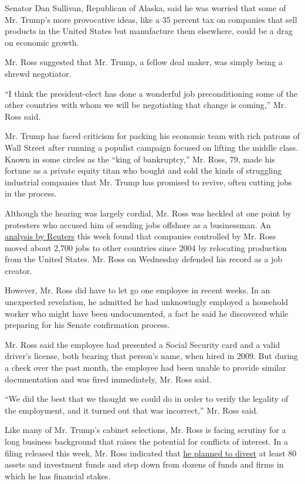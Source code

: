 Senator Dan Sullivan, Republican of Alaska, said he was worried that
some of Mr. Trump's more provocative ideas, like a 35 percent tax on
companies that sell products in the United States but manufacture them
elsewhere, could be a drag on economic growth.

Mr. Ross suggested that Mr. Trump, a fellow deal maker, was simply being
a shrewd negotiator.

``I think the president-elect has done a wonderful job preconditioning
some of the other countries with whom we will be negotiating that change
is coming,'' Mr. Ross said.

Mr. Trump has faced criticism for packing his economic team with rich
patrons of Wall Street after running a populist campaign focused on
lifting the middle class. Known in some circles as the ``king of
bankruptcy,'' Mr. Ross, 79, made his fortune as a private equity titan
who bought and sold the kinds of struggling industrial companies that
Mr. Trump has promised to revive, often cutting jobs in the process.

Although the hearing was largely cordial, Mr. Ross was heckled at one
point by protesters who accused him of sending jobs offshore as a
businessman. An
\href{http://www.reuters.com/article/us-usa-trump-jobs-idUSKBN1510FM}{analysis
by Reuters} this week found that companies controlled by Mr. Ross moved
about 2,700 jobs to other countries since 2004 by relocating production
from the United States. Mr. Ross on Wednesday defended his record as a
job creator.

However, Mr. Ross did have to let go one employee in recent weeks. In an
unexpected revelation, he admitted he had unknowingly employed a
household worker who might have been undocumented, a fact he said he
discovered while preparing for his Senate confirmation process.

Mr. Ross said the employee had presented a Social Security card and a
valid driver's license, both bearing that person's name, when hired in
2009. But during a check over the past month, the employee had been
unable to provide similar documentation and was fired immediately, Mr.
Ross said.

``We did the best that we thought we could do in order to verify the
legality of the employment, and it turned out that was incorrect,'' Mr.
Ross said.

Like many of Mr. Trump's cabinet selections, Mr. Ross is facing scrutiny
for a long business background that raises the potential for conflicts
of interest. In a filing released this week, Mr. Ross indicated that
\href{https://www.nytimes.com/2017/01/17/business/commerce-secretary-pick-wilbur-ross.html}{he
planned to divest} at least 80 assets and investment funds and step down
from dozens of funds and firms in which he has financial stakes.


